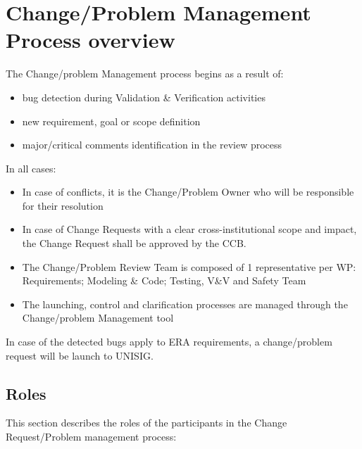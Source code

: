 \documentclass{template/openetcs_article}
\begin{document}
\section{Change/Problem Management Process overview}

The Change/problem Management process begins as a result of:
\begin{itemize}
\item bug detection during Validation \& Verification activities
\item new requirement, goal or scope definition
\item major/critical comments identification in the review process 
\end{itemize}

In all cases:
\begin{itemize}
\item In case of conflicts, it is the Change/Problem Owner who will be responsible for their resolution
\item In case of Change Requests with a clear cross-institutional scope and impact, the Change Request shall be approved by the CCB.
\item The Change/Problem Review Team is composed of 1 representative per WP: Requirements; Modeling \& Code; Testing, V\&V and Safety Team
\item The launching, control and clarification processes are managed through the Change/problem Management tool
\end{itemize}

In case of the detected bugs apply to ERA requirements, a change/problem request will be launch to UNISIG.

\subsection{Roles}

This section describes the roles of the participants in the Change Request/Problem management process:
\end{document}

